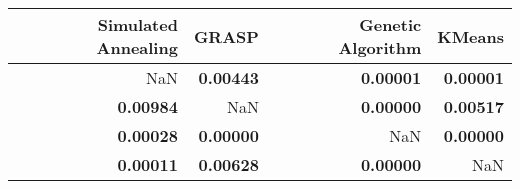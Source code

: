 \begin{table}
\centering
\label{tab:teste_pareado}
\begin{tabular}{rrrr}
\toprule
Simulated Annealing &            GRASP & Genetic Algorithm &           KMeans \\
\midrule
                NaN & \textbf{0.00443} &  \textbf{0.00001} & \textbf{0.00001} \\
   \textbf{0.00984} &              NaN &  \textbf{0.00000} & \textbf{0.00517} \\
   \textbf{0.00028} & \textbf{0.00000} &               NaN & \textbf{0.00000} \\
   \textbf{0.00011} & \textbf{0.00628} &  \textbf{0.00000} &              NaN \\
\bottomrule
\end{tabular}
\end{table}
